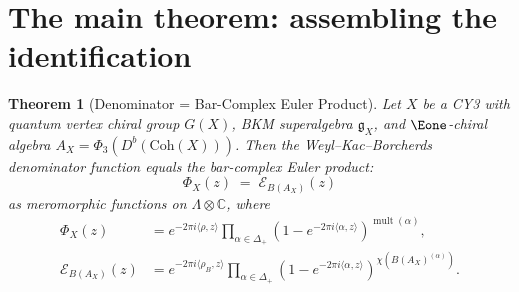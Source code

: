 \documentclass[11pt]{article}
\newtheorem{theorem}{Theorem}[section]
\theoremstyle{definition}
\theoremstyle{remark}
\DeclareMathOperator{\mult}{mult}
\newcommand{\frakg}{\mathfrak{g}}
\begin{document}
\section{The main theorem: assembling the identification}
\label{sec:main-thm}

\begin{theorem}[Denominator = Bar-Complex Euler Product]
\label{thm:denom-bar-euler}
Let $X$ be a CY3 with quantum vertex chiral group $G(X)$, BKM superalgebra
$\frakg_X$, and $\Eone$-chiral algebra $A_X = \Phi_3(D^b(\mathrm{Coh}(X)))$.
Then the Weyl--Kac--Borcherds denominator function equals the bar-complex
Euler product:
\begin{equation}
\label{eq:main}
 \boxed{
 \Phi_X(z)
 \;=\;
 \mathcal{E}_{B(A_X)}(z)
 }
\end{equation}
as meromorphic functions on $\Lambda \otimes \mathbb{C}$, where
\begin{align}
 \Phi_X(z) &= e^{-2\pi i\langle\rho,z\rangle}
 \prod_{\alpha \in \Delta_+}
 (1 - e^{-2\pi i\langle\alpha,z\rangle})^{\mult(\alpha)}, \\
 \mathcal{E}_{B(A_X)}(z) &= e^{-2\pi i\langle\rho_B,z\rangle}
 \prod_{\alpha \in \Delta_+}
 (1 - e^{-2\pi i\langle\alpha,z\rangle})^{\chi(B(A_X)^{(\alpha)})}.
\end{align}
\end{theorem}
\end{document}
